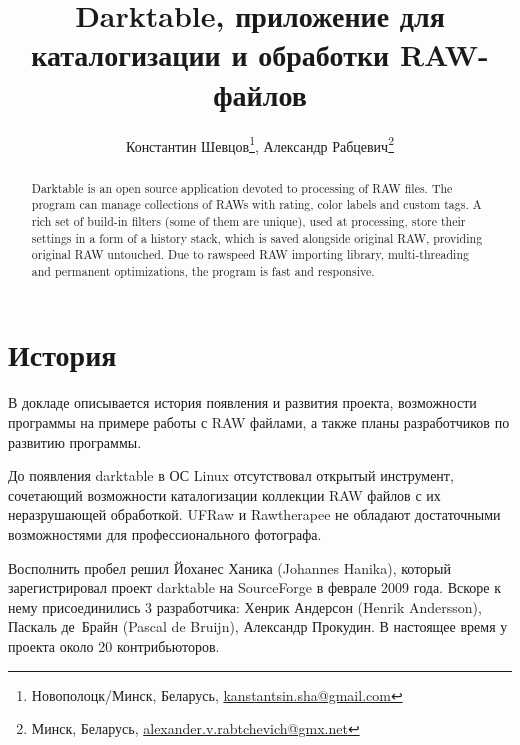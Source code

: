 \documentclass[10pt, a5paper]{article}
\begin{document}
\title{Darktable, приложение для каталогизации и обработки RAW-файлов}
\author{Константин Шевцов\footnote{Новополоцк/Минск, Беларусь, \url{kanstantsin.sha@gmail.com}}, Александр Рабцевич\footnote{Минск, Беларусь, \url{alexander.v.rabtchevich@gmx.net}}}
\date{}

\def\progref!#1!{\texttt{#1}}

\maketitle

\begin{abstract}
Darktable is an open source application devoted to processing of RAW files. The program can manage collections of RAWs with rating, color labels and custom tags. A rich set of build-in filters (some of them are unique), used at processing, store their settings in a form of a history stack, which is saved alongside original RAW, providing original RAW untouched. Due to rawspeed RAW importing library, multi-threading and permanent optimizations, the program is fast and responsive.
\end{abstract}

\section*{История}
В докладе описывается история появления и развития проекта, возможности программы на примере работы с RAW файлами, а также планы разработчиков по развитию программы.

До появления darktable в ОС Linux отсутствовал открытый инструмент, сочетающий возможности каталогизации коллекции RAW файлов с их неразрушающей обработкой. UFRaw и  Rawtherapee не обладают достаточными возможностями для профессионального фотографа.

Восполнить пробел решил Йоханес Ханика (Johannes Hanika), который зарегистрировал проект darktable на SourceForge в феврале 2009 года. Вскоре к нему присоединились 3 разработчика: Хенрик Андерсон (Henrik Andersson), Паскаль де Брайн (Pascal de Bruijn), Александр Прокудин. В настоящее время у проекта около 20 контрибьюторов. 
\end{document}

